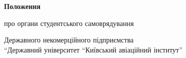 \documentclass[12pt, a4paper]{article}
\begin{document}
\begin{titlepage}
    \centering
    \vspace*{\fill} %

    {\Huge\bfseries Положення}\par %
    \vspace{1em} %
    {\LARGE про органи студентського самоврядування}\par %
    \vspace{0.5em} %
    {\large Державного некомерційного підприємства \\ ``Державний університет ``Київський авіаційний інститут''}\par %

    \vspace*{\fill} %
\end{titlepage}
















\end{document}
